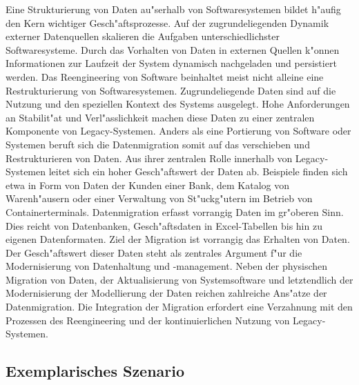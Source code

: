Eine Strukturierung von Daten au"serhalb von Softwaresystemen bildet h"aufig den Kern wichtiger Gesch"aftsprozesse. Auf der zugrundeliegenden Dynamik externer Datenquellen skalieren die Aufgaben unterschiedlichster Softwaresysteme. Durch das Vorhalten von Daten in externen Quellen k"onnen Informationen zur Laufzeit der System dynamisch nachgeladen und persistiert werden.
\lb
Das Reengineering von Software beinhaltet meist nicht alleine eine Restrukturierung von Softwaresystemen. Zugrundeliegende Daten sind auf die Nutzung und den speziellen Kontext des Systems ausgelegt. Hohe Anforderungen an Stabilit"at und Verl"asslichkeit machen diese Daten zu einer zentralen Komponente von Legacy-Systemen.
\lb
Anders als eine Portierung von Software oder Systemen beruft sich die Datenmigration somit auf das verschieben und Restrukturieren von Daten.
\lb
Aus ihrer zentralen Rolle innerhalb von Legacy-Systemen leitet sich ein hoher Gesch"aftswert der Daten ab. Beispiele finden sich etwa in Form von Daten der Kunden einer Bank, dem Katalog von Warenh"ausern oder einer Verwaltung von St"uckg"utern im Betrieb von Containerterminals. 
\lb
Datenmigration erfasst vorrangig Daten im gr"oberen Sinn. Dies reicht von Datenbanken, Gesch"aftsdaten in Excel-Tabellen bis hin zu eigenen Datenformaten. Ziel der Migration ist vorrangig das Erhalten von Daten. Der Gesch"aftswert dieser Daten steht als zentrales Argument f"ur die Modernisierung von Datenhaltung und -management. Neben der physischen Migration von Daten, der Aktualisierung von Systemsoftware und letztendlich der Modernisierung der Modellierung der Daten reichen zahlreiche Ans"atze der Datenmigration. Die Integration der Migration erfordert eine Verzahnung mit den Prozessen des Reengineering und der kontinuierlichen Nutzung von Legacy-Systemen.

\subsection{Exemplarisches Szenario}

